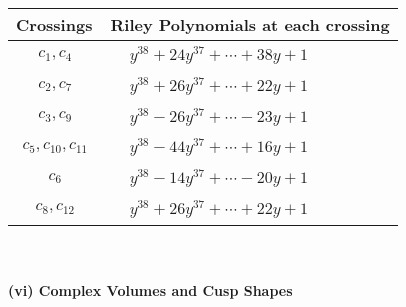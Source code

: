 \documentclass[1p]{elsarticle_modified}
\theoremstyle{definition}
\begin{document}
\begin{tabular}{m{50pt}|m{274pt}}
Crossings & \hspace{64pt}Riley Polynomials at each crossing \\
\hline $$\begin{aligned}c_{1},c_{4}\end{aligned}$$&$\begin{aligned}
&y^{38}+24 y^{37}+\cdots+38 y+1
\end{aligned}$\\
\hline $$\begin{aligned}c_{2},c_{7}\end{aligned}$$&$\begin{aligned}
&y^{38}+26 y^{37}+\cdots+22 y+1
\end{aligned}$\\
\hline $$\begin{aligned}c_{3},c_{9}\end{aligned}$$&$\begin{aligned}
&y^{38}-26 y^{37}+\cdots-23 y+1
\end{aligned}$\\
\hline $$\begin{aligned}c_{5},c_{10},c_{11}\end{aligned}$$&$\begin{aligned}
&y^{38}-44 y^{37}+\cdots+16 y+1
\end{aligned}$\\
\hline $$\begin{aligned}c_{6}\end{aligned}$$&$\begin{aligned}
&y^{38}-14 y^{37}+\cdots-20 y+1
\end{aligned}$\\
\hline $$\begin{aligned}c_{8},c_{12}\end{aligned}$$&$\begin{aligned}
&y^{38}+26 y^{37}+\cdots+22 y+1
\end{aligned}$\\
\hline
\end{tabular}\\~\\
\newpage\flushleft \textbf{(vi) Complex Volumes and Cusp Shapes}
\end{document}
